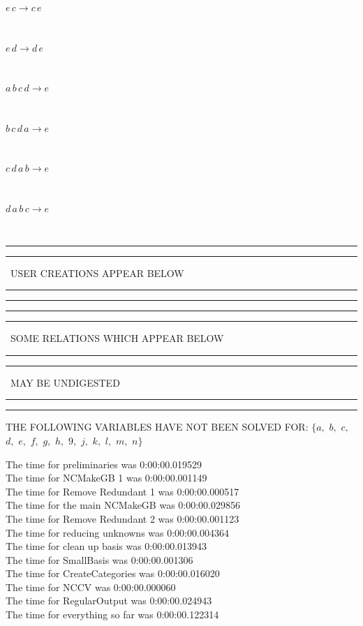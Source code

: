 \documentclass[rep10,leqno]{report}
\begin{document}
\begin{minipage}{6in}
$
e\,
 c\rightarrow c\,
 e
$
\end{minipage}\medskip \\
\begin{minipage}{6in}
$
e\,
 d\rightarrow d\,
 e
$
\end{minipage}\medskip \\
\begin{minipage}{6in}
$
a\,
 b\,
 c\,
 d\rightarrow e
$
\end{minipage}\medskip \\
\begin{minipage}{6in}
$
b\,
 c\,
 d\,
 a\rightarrow e
$
\end{minipage}\medskip \\
\begin{minipage}{6in}
$
c\,
 d\,
 a\,
 b\rightarrow e
$
\end{minipage}\medskip \\
\begin{minipage}{6in}
$
d\,
 a\,
 b\,
 c\rightarrow e
$
\end{minipage}\\
\rule[2pt]{6in}{1pt}\hfil\break
\rule[2.5pt]{1.701in}{1pt}
\ USER CREATIONS APPEAR BELOW\ 
\rule[2.5pt]{1.701in}{1pt}\hfil\break
\rule[2pt]{6in}{1pt}\hfil\break
\rule[2pt]{6in}{4pt}\hfil\break
\rule[2pt]{1.45in}{4pt}
\ SOME RELATIONS WHICH APPEAR BELOW\ 
\rule[2pt]{1.45in}{4pt}\hfil\break
\rule[2pt]{2.18in}{4pt}
\ MAY BE UNDIGESTED\ 
\rule[2pt]{2.18in}{4pt}\hfil\break
\rule[2pt]{6in}{4pt}\hfil\break
THE FOLLOWING VARIABLES HAVE NOT BEEN SOLVED FOR:\hfil\break
$\{a,
$ $
b,
$ $
c,
$ $
d,
$ $
e,
$ $
f,
$ $
g,
$ $
h,
$ $
9,
$ $
j,
$ $
k,
$ $
l,
$ $
m,
$ $
n\}$
\smallskip\\
\vspace{10pt}

\noindent
The time for preliminaries was 0:00:00.019529\\
The time for NCMakeGB 1 was 0:00:00.001149\\
The time for Remove Redundant 1 was 0:00:00.000517\\
The time for the main NCMakeGB was 0:00:00.029856\\
The time for Remove Redundant 2 was 0:00:00.001123\\
The time for reducing unknowns was 0:00:00.004364\\
The time for clean up basis was 0:00:00.013943\\
The time for SmallBasis was 0:00:00.001306\\
The time for CreateCategories was 0:00:00.016020\\
The time for NCCV was 0:00:00.000060\\
The time for RegularOutput was 0:00:00.024943\\
The time for everything so far was 0:00:00.122314\\
\end{document}
